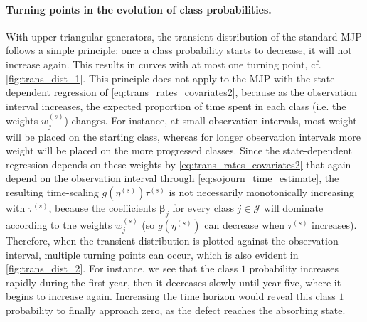 \documentclass{article}
\begin{document}
\paragraph{Turning points in the evolution of class probabilities.} \label{sec:turning_points}
With upper triangular generators, the transient distribution of the standard MJP follows a simple principle: once a class probability starts to decrease, it will not increase again. This results in curves with at most one turning point, cf. \cref{fig:trans_dist_1}. 
This principle does not apply to the MJP with the state-dependent regression of \cref{eq:trans_rates_covariates2}, because as the observation interval increases, the expected proportion of time spent in each class (i.e. the weights $w_j^{(s)}$) changes. For instance, at small observation intervals, most weight will be placed on the starting class, whereas for longer observation intervals more weight will be placed on the more progressed classes.
Since the state-dependent regression depends on these weights by \cref{eq:trans_rates_covariates2} that again depend on the observation interval through \cref{eq:sojourn_time_estimate}, the resulting time-scaling $g(\eta^{(s)}) \tau^{(s)}$ is not necessarily monotonically increasing with $\tau^{(s)}$, because the coefficients $\bm \beta_j$ for every class $j \in \mathcal J$ will dominate according to the weights $w_j^{(s)}$ (so $g(\eta^{(s)})$ can decrease when $\tau^{(s)}$ increases).
Therefore, when the transient distribution is plotted against the observation interval, multiple turning points can occur, which is also evident in \cref{fig:trans_dist_2}. For instance, we see that the class $1$ probability increases rapidly during the first year, then it decreases slowly until year five, where it begins to increase again. Increasing the time horizon would reveal this class $1$ probability to finally approach zero, as the defect reaches the absorbing state.
\end{document}
